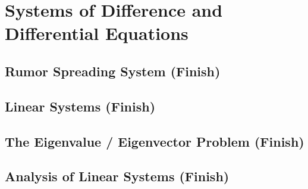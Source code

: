 \chapter{Systems of Difference and Differential Equations}

\section{Rumor Spreading System (Finish)}

\section{Linear Systems (Finish)}

\section{The Eigenvalue / Eigenvector Problem (Finish)}

\section{Analysis of Linear Systems (Finish)}


